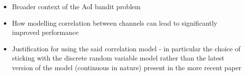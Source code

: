 \begin{itemize}
	\item Broader context of the AoI bandit problem
	\item How modelling correlation between channels can lead to significantly improved performance
	\item Justification for using the said correlation model - in particular the choice of sticking with the discrete random variable model rather than the latest version of the model (continuous in nature) present in the more recent paper
\end{itemize}